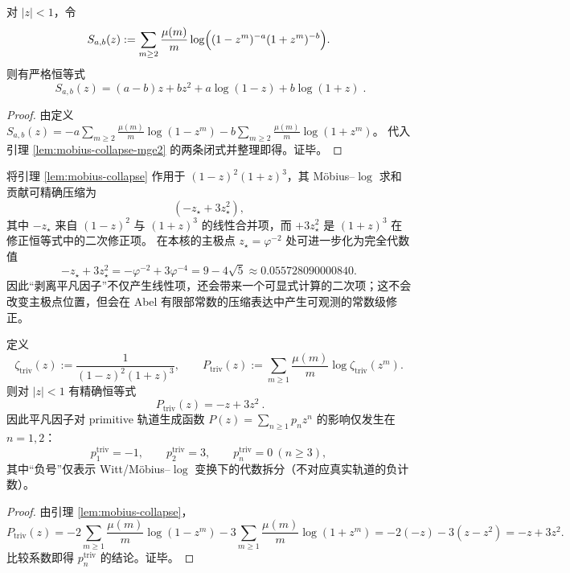 \begin{corollary}[一般形态：\texorpdfstring{$(1-z)^a(1+z)^b$}{(1-z)^a(1+z)^b} 的 \texorpdfstring{$m\ge 2$}{m>=2} Möbius--$\log$ 闭式]\label{cor:mobius-collapse-mge2-ab}
对 $|z|<1$，令
\[
S_{a,b}(z):=\sum_{m\ge 2}\frac{\mu(m)}{m}\log\Bigl((1-z^m)^{-a}(1+z^m)^{-b}\Bigr).
\]
则有严格恒等式
\[
\boxed{\;
S_{a,b}(z)=(a-b)z+bz^2+a\log(1-z)+b\log(1+z)\; }.
\]
\end{corollary}

\begin{proof}
由定义
\(
S_{a,b}(z)=-a\sum_{m\ge 2}\frac{\mu(m)}{m}\log(1-z^m)-b\sum_{m\ge 2}\frac{\mu(m)}{m}\log(1+z^m)
\)。
代入引理 \ref{lem:mobius-collapse-mge2} 的两条闭式并整理即得。证毕。
\end{proof}

\begin{remark}[剥离平凡因子后的非平凡部分]
将引理 \ref{lem:mobius-collapse} 作用于 $(1-z)^2(1+z)^3$，其 Möbius--$\log$ 求和贡献可精确压缩为
\[
(-z_\star+3z_\star^2),
\]
其中 $-z_\star$ 来自 $(1-z)^2$ 与 $(1+z)^3$ 的线性合并项，而 $+3z_\star^2$ 是 $(1+z)^3$ 在修正恒等式中的二次修正项。
在本核的主极点 $z_\star=\varphi^{-2}$ 处可进一步化为完全代数值
\[
-z_\star+3z_\star^2
=-\varphi^{-2}+3\varphi^{-4}
=9-4\sqrt5
\approx 0.055728090000840.
\]
因此“剥离平凡因子”不仅产生线性项，还会带来一个可显式计算的二次项；这不会改变主极点位置，但会在 Abel 有限部常数的压缩表达中产生可观测的常数级修正。
\end{remark}

\begin{proposition}\label{prop:triv-factor-primitive-polynomial}
定义
\[
\zeta_{\mathrm{triv}}(z):=\frac{1}{(1-z)^2(1+z)^3},
\qquad
P_{\mathrm{triv}}(z):=\sum_{m\ge 1}\frac{\mu(m)}{m}\log\zeta_{\mathrm{triv}}(z^m).
\]
则对 \(|z|<1\) 有精确恒等式
\[
\boxed{\ P_{\mathrm{triv}}(z)=-z+3z^2\ }.
\]
因此平凡因子对 primitive 轨道生成函数 \(P(z)=\sum_{n\ge 1}p_n z^n\) 的影响仅发生在 \(n=1,2\)：
\[
p^{\mathrm{triv}}_1=-1,\qquad p^{\mathrm{triv}}_2=3,\qquad p^{\mathrm{triv}}_n=0\ (n\ge 3),
\]
其中“负号”仅表示 Witt/Möbius--$\log$ 变换下的代数拆分（不对应真实轨道的负计数）。
\end{proposition}
\begin{proof}
由引理 \ref{lem:mobius-collapse}，
\[
P_{\mathrm{triv}}(z)
=-2\sum_{m\ge 1}\frac{\mu(m)}{m}\log(1-z^m)-3\sum_{m\ge 1}\frac{\mu(m)}{m}\log(1+z^m)
=-2(-z)-3(z-z^2)=-z+3z^2.
\]
比较系数即得 \(p^{\mathrm{triv}}_n\) 的结论。证毕。
\end{proof}

